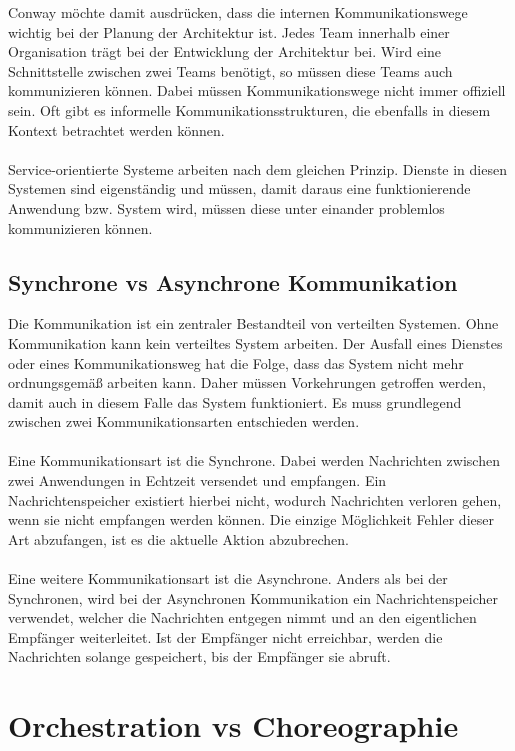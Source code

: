 Conway möchte damit ausdrücken, dass die internen Kommunikationswege wichtig bei der Planung der Architektur ist. Jedes Team innerhalb einer Organisation trägt bei der Entwicklung der Architektur bei. Wird eine Schnittstelle zwischen zwei Teams benötigt, so müssen diese Teams auch kommunizieren können. Dabei müssen Kommunikationswege nicht immer offiziell sein. Oft gibt es informelle Kommunikationsstrukturen, die ebenfalls in diesem Kontext betrachtet werden können.
\\\\
Service-orientierte Systeme arbeiten nach dem gleichen Prinzip. Dienste in diesen Systemen sind eigenständig und müssen, damit daraus eine funktionierende Anwendung bzw. System wird, müssen diese unter einander problemlos kommunizieren können.

\subsection{Synchrone vs Asynchrone Kommunikation}
\label{subsec:KommunikationASynchrone}
Die Kommunikation ist ein zentraler Bestandteil von verteilten Systemen. Ohne Kommunikation kann kein verteiltes System arbeiten. Der Ausfall eines Dienstes oder eines Kommunikationsweg hat die Folge, dass das System nicht mehr ordnungsgemäß arbeiten kann. Daher müssen Vorkehrungen getroffen werden, damit auch in diesem Falle das System funktioniert. Es muss grundlegend zwischen zwei Kommunikationsarten entschieden werden.
\\\\
Eine Kommunikationsart ist die Synchrone. Dabei werden Nachrichten zwischen zwei Anwendungen in Echtzeit versendet und empfangen. Ein Nachrichtenspeicher existiert hierbei nicht, wodurch Nachrichten verloren gehen, wenn sie nicht empfangen werden können. Die einzige Möglichkeit Fehler dieser Art abzufangen, ist es die aktuelle Aktion abzubrechen.
\\\\
Eine weitere Kommunikationsart ist die Asynchrone. Anders als bei der Synchronen, wird bei der Asynchronen Kommunikation ein Nachrichtenspeicher verwendet, welcher die Nachrichten entgegen nimmt und an den eigentlichen Empfänger weiterleitet. Ist der Empfänger nicht erreichbar, werden die Nachrichten solange gespeichert, bis der Empfänger sie abruft.

\section{Orchestration vs Choreographie}
\label{sec:OrchestrationVsChoregraphie}

